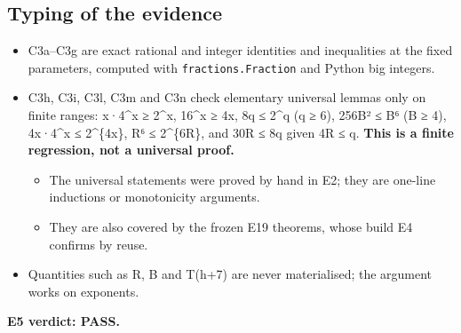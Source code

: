 \documentclass[
]{article}
\providecommand{\tightlist}{%
  \setlength{\itemsep}{0pt}\setlength{\parskip}{0pt}}
\begin{document}
\subsection{Typing of the evidence}\label{typing-of-the-evidence}

\begin{itemize}
\tightlist
\item
  C3a--C3g are exact rational and integer identities and inequalities at
  the fixed parameters, computed with \texttt{fractions.Fraction} and
  Python big integers.
\item
  C3h, C3i, C3l, C3m and C3n check elementary universal lemmas only on
  finite ranges: x·4\^{}x ≥ 2\^{}x, 16\^{}x ≥ 4x, 8q ≤ 2\^{}q (q ≥ 6),
  256B² ≤ B⁶ (B ≥ 4), 4x·4\^{}x ≤ 2\^{}\{4x\}, R⁶ ≤ 2\^{}\{6R\}, and 30R
  ≤ 8q given 4R ≤ q. \textbf{This is a finite regression, not a
  universal proof.}

  \begin{itemize}
  \tightlist
  \item
    The universal statements were proved by hand in E2; they are
    one-line inductions or monotonicity arguments.
  \item
    They are also covered by the frozen E19 theorems, whose build E4
    confirms by reuse.
  \end{itemize}
\item
  Quantities such as R, B and T(h+7) are never materialised; the
  argument works on exponents.
\end{itemize}

\textbf{E5 verdict: PASS.}
\end{document}
